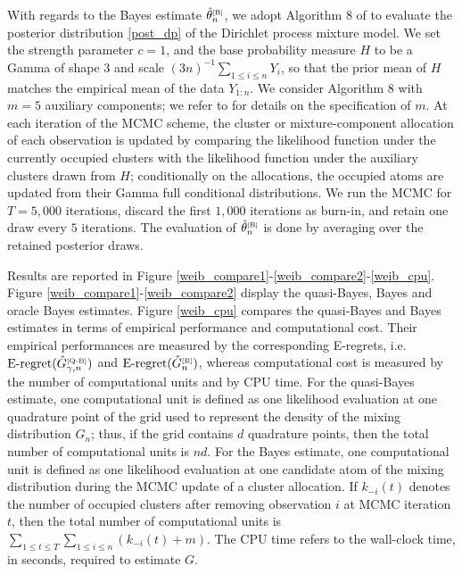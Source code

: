 \documentclass[twoside,12pt]{article}
\begin{document}
With regards to the Bayes estimate $\hat{\theta}^{\text{\tiny{[B]}}}_{n}$, we adopt Algorithm 8 of \citet{Nea(00)} to evaluate the posterior distribution \eqref{post_dp} of the Dirichlet process mixture model. We set the strength parameter $c=1$, and the base probability measure $H$ to be a Gamma of shape $3$ and scale $(3n)^{-1}\sum_{1\leq i\leq n}Y_{i}$, so that the prior mean of $H$ matches the empirical mean of the data $Y_{1:n}$. We consider Algorithm 8 with $m=5$ auxiliary components; we refer to  \citet[Section 6]{Nea(00)} for details on the specification of $m$.  At each iteration of the MCMC scheme, the cluster or mixture-component allocation of each observation is updated by comparing the likelihood function under the currently occupied clusters with the likelihood function under the auxiliary clusters  drawn from $H$; conditionally on the allocations, the occupied atoms are updated from their Gamma full conditional distributions. We run the MCMC for  $T=5,000$ iterations, discard the first $1,000$ iterations as burn-in, and retain one draw every $5$ iterations. The evaluation of $\hat{\theta}^{\text{\tiny{[B]}}}_{n}$ is done by averaging over the retained posterior draws.

Results are reported in Figure \ref{weib_compare1}-\ref{weib_compare2}-\ref{weib_cpu}. Figure \ref{weib_compare1}-\ref{weib_compare2} display the quasi-Bayes, Bayes and oracle Bayes estimates. Figure \ref{weib_cpu} compares the quasi-Bayes and Bayes estimates in terms of empirical performance and computational cost. Their empirical performances are measured by the corresponding E-regrets, i.e. $\mathrm{E\text{-}regret}(\hat{G}_{\gamma,n}^{\text{\tiny{[Q-B]}}})$ and $\mathrm{E\text{-}regret}(\hat{G}_{n}^{\text{\tiny{[B]}}})$, whereas computational cost is measured by the number of computational units and by CPU time. For the quasi-Bayes estimate, one computational unit is defined as one likelihood evaluation at one quadrature point of the grid used to represent the density of the mixing distribution $G_{n}$; thus, if the grid contains $d$ quadrature points, then the total number of computational units is $nd$. For the Bayes estimate, one computational unit is defined as one likelihood evaluation at one candidate atom of the mixing distribution during the MCMC update of a cluster allocation. If $k_{-i}(t)$ denotes the number of occupied clusters after removing observation $i$ at MCMC iteration $t$, then the total number of computational units is $\sum_{1\leq t\leq T}\sum_{1\leq i\leq n}(k_{-i}(t)+m)$. The CPU time refers to the wall-clock time, in seconds, required to estimate $G$.
\end{document}
